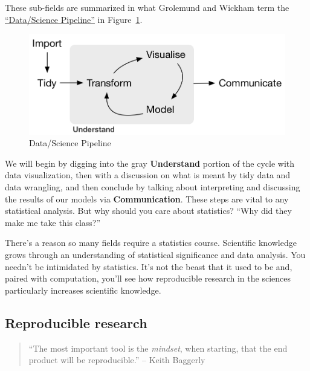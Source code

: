 \documentclass[
  letterpaper,
  DIV=11,
  numbers=noendperiod]{scrreprt}
\theoremstyle{definition}
\theoremstyle{remark}
\begin{document}
These sub-fields are summarized in what Grolemund and Wickham term the
\href{http://r4ds.had.co.nz/explore-intro.html}{``Data/Science
Pipeline''} in Figure~\ref{fig-pipline}.

\begin{figure}

{\centering \includegraphics{images/tidy1.png}

}

\caption{\label{fig-pipline}Data/Science Pipeline}

\end{figure}

We will begin by digging into the gray \textbf{Understand} portion of
the cycle with data visualization, then with a discussion on what is
meant by tidy data and data wrangling, and then conclude by talking
about interpreting and discussing the results of our models via
\textbf{Communication}. These steps are vital to any statistical
analysis. But why should you care about statistics? ``Why did they make
me take this class?''

There's a reason so many fields require a statistics course. Scientific
knowledge grows through an understanding of statistical significance and
data analysis. You needn't be intimidated by statistics. It's not the
beast that it used to be and, paired with computation, you'll see how
reproducible research in the sciences particularly increases scientific
knowledge.

\hypertarget{reproducible-research}{%
\subsection*{Reproducible research}\label{reproducible-research}}

\begin{quote}
``The most important tool is the \emph{mindset}, when starting, that the
end product will be reproducible.'' -- Keith Baggerly
\end{quote}
\end{document}
